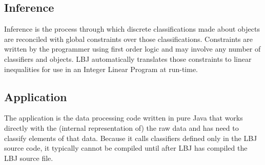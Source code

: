 \subsection*{Inference}
Inference is the process through which discrete classifications made about
objects are reconciled with global constraints over those classifications.
Constraints are written by the programmer using first order logic and may
involve any number of classifiers and objects.  LBJ automatically translates
those constraints to linear inequalities for use in an Integer Linear Program
at run-time.

\subsection*{Application}
The application is the data processing code written in pure Java that works
directly with the (internal representation of) the raw data and has need to
classify elements of that data.  Because it calls classifiers defined only in
the LBJ source code, it typically cannot be compiled until after LBJ has
compiled the LBJ source file.

